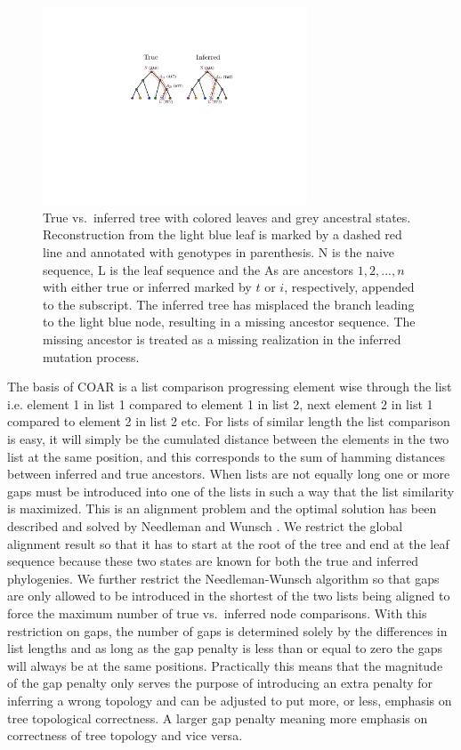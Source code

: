 \begin{figure}[ht!]
    \centering
    \includegraphics[width=0.7\textwidth]{figures/ASR_true_vs_inferred.pdf}
    \caption{
        \label{fig:ASR_true_vs_inferred}
        True vs.\ inferred tree with colored leaves and grey ancestral states. Reconstruction from the light blue leaf is marked by a dashed red line and annotated with genotypes in parenthesis. N is the naive sequence, L is the leaf sequence and the As are ancestors $1,2,...,n$ with either true or inferred marked by $t$ or $i$, respectively, appended to the subscript. The inferred tree has misplaced the branch leading to the light blue node, resulting in a missing ancestor sequence. The missing ancestor is treated as a missing realization in the inferred mutation process.
    }
\end{figure}


The basis of COAR is a list comparison progressing element wise through the list i.e. element 1 in list 1 compared to element 1 in list 2, next element 2 in list 1 compared to element 2 in list 2 etc.
For lists of similar length the list comparison is easy, it will simply be the cumulated distance between the elements in the two list at the same position, and this corresponds to the sum of hamming distances between inferred and true ancestors.
When lists are not equally long one or more gaps must be introduced into one of the lists in such a way that the list similarity is maximized.
This is an alignment problem and the optimal solution has been described and solved by Needleman and Wunsch \cite{needleman1970general}.
We restrict the global alignment result so that it has to start at the root of the tree and end at the leaf sequence because these two states are known for both the true and inferred phylogenies.
We further restrict the Needleman-Wunsch algorithm so that gaps are only allowed to be introduced in the shortest of the two lists being aligned to force the maximum number of true vs.\ inferred node comparisons.
With this restriction on gaps, the number of gaps is determined solely by the differences in list lengths and as long as the gap penalty is less than or equal to zero the gaps will always be at the same positions.
Practically this means that the magnitude of the gap penalty only serves the purpose of introducing an extra penalty for inferring a wrong topology and can be adjusted to put more, or less, emphasis on tree topological correctness.
A larger gap penalty meaning more emphasis on correctness of tree topology and vice versa.

